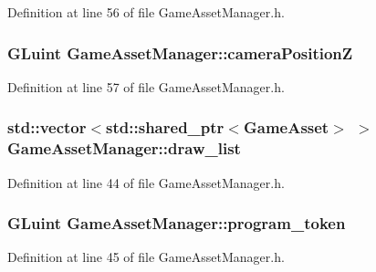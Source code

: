 Definition at line 56 of file Game\+Asset\+Manager.\+h.

\hypertarget{class_game_asset_manager_a076d00cef5f59a5038e168a0cc80420d}{}
\subsubsection[{camera\+Position\+Z}]{\setlength{\rightskip}{0pt plus 5cm}G\+Luint Game\+Asset\+Manager\+::camera\+Position\+Z\hspace{0.3cm}{\ttfamily [private]}}\label{class_game_asset_manager_a076d00cef5f59a5038e168a0cc80420d}


Definition at line 57 of file Game\+Asset\+Manager.\+h.

\hypertarget{class_game_asset_manager_a671cddd92f1de4186c582fe0c4297b7d}{}
\subsubsection[{draw\+\_\+list}]{\setlength{\rightskip}{0pt plus 5cm}std\+::vector$<$std\+::shared\+\_\+ptr$<${\bf Game\+Asset}$>$ $>$ Game\+Asset\+Manager\+::draw\+\_\+list\hspace{0.3cm}{\ttfamily [private]}}\label{class_game_asset_manager_a671cddd92f1de4186c582fe0c4297b7d}


Definition at line 44 of file Game\+Asset\+Manager.\+h.

\hypertarget{class_game_asset_manager_ad7bab17862e06ca692289f934b40548b}{}
\subsubsection[{program\+\_\+token}]{\setlength{\rightskip}{0pt plus 5cm}G\+Luint Game\+Asset\+Manager\+::program\+\_\+token\hspace{0.3cm}{\ttfamily [private]}}\label{class_game_asset_manager_ad7bab17862e06ca692289f934b40548b}


Definition at line 45 of file Game\+Asset\+Manager.\+h.

